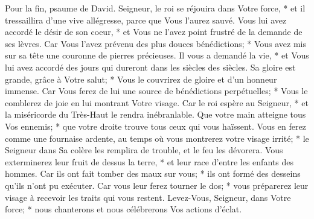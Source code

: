 Pour la fin, psaume de David.
Seigneur, le roi se réjouira dans Votre force, * et il tressaillira d'une vive allégresse, parce que Vous l'aurez sauvé.
Vous lui avez accordé le désir de son coeur, * et Vous ne l'avez point frustré de la demande de ses lèvres.
Car Vous l'avez prévenu des plus douces bénédictions; * Vous avez mis sur sa tête une couronne de pierres précieuses.
Il vous a demandé la vie, * et Vous lui avez accordé des jours qui dureront dans les siècles des siècles.
Sa gloire est grande, grâce à Votre salut; * Vous le couvrirez de gloire et d'un honneur immense.
Car Vous ferez de lui une source de bénédictions perpétuelles; * Vous le comblerez de joie en lui montrant Votre visage.
Car le roi espère au Seigneur, * et la miséricorde du Très-Haut le rendra inébranlable.
Que votre main atteigne tous Vos ennemis; * que votre droite trouve tous ceux qui vous haïssent.
Vous en ferez comme une fournaise ardente, au temps où vous montrerez votre visage irrité; * le Seigneur dans Sa colère les remplira de trouble, et le feu les dévorera.
Vous exterminerez leur fruit de dessus la terre, * et leur race d'entre les enfants des hommes.
Car ils ont fait tomber des maux sur vous; * ils ont formé des desseins qu'ils n'ont pu exécuter.
Car vous leur ferez tourner le dos; * vous préparerez leur visage à recevoir les traits qui vous restent.
Levez-Vous, Seigneur, dans Votre force; * nous chanterons et nous célébrerons Vos actions d'éclat.

